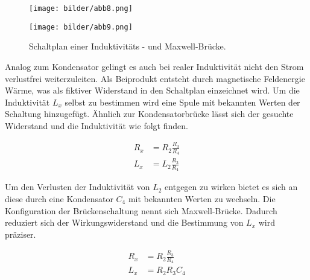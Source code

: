 \begin{figure}
\begin{minipage}[c]{0.5\textwidth}
    \centering
    \texttt{[image: bilder/abb8.png]}
    \label{fig:abb8}
\end{minipage}    
\begin{minipage}[c]{0.5\textwidth}
            \centering
        \texttt{[image: bilder/abb9.png]}
        \label{fig:abb9}
\end{minipage}
\caption{Schaltplan einer Induktivitäts - und Maxwell-Brücke. \cite{skript}}
\label{??}
\end{figure}
\begin{flushleft}
Analog zum Kondensator gelingt es auch bei realer Induktivität nicht den Strom verlustfrei weiterzuleiten.
Als Beiprodukt entsteht durch magnetische Feldenergie Wärme, was als fiktiver Widerstand in den Schaltplan einzeichnet wird.
Um die Induktivität $L_x$ selbst zu bestimmen wird eine Spule mit bekannten Werten der Schaltung hinzugefügt. 
Ähnlich zur Kondensatorbrücke lässt sich der gesuchte Widerstand und die Induktivität wie folgt finden.
\end{flushleft}
\begin{align}
    \label{eqn:induk}
    R_x &= R_2\frac{R_3}{R_4} \\
    L_x &= L_2\frac{R_3}{R_4}
\end{align}
\begin{flushleft}
Um den Verlusten der Induktivität von $L_2$ entgegen zu wirken bietet es sich an diese durch eine Kondensator $C_4$ mit bekannten Werten
zu wechseln. Die Konfiguration der Brückenschaltung nennt sich Maxwell-Brücke.
Dadurch reduziert sich der Wirkungswiderstand und die Bestimmung von $L_x$ wird präziser.
\end{flushleft}
\begin{align}
    \label{eqn:stuff}
    R_x &= R_2\frac{R_3}{R_4} \\
    L_x &= R_2R_3C_4
\end{align}
\\
\newline
